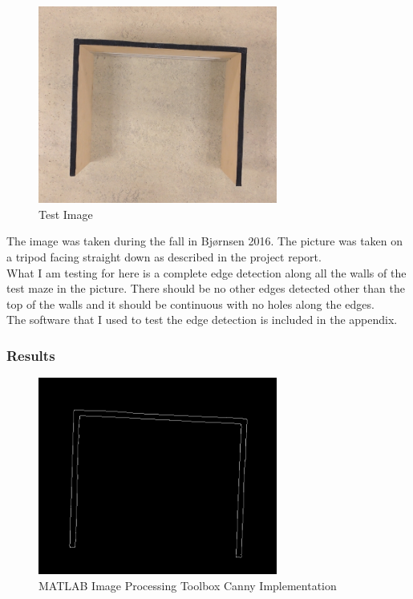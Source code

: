 \begin{figure}[H]
\centering
\includegraphics[width=0.7\textwidth]{fig/edgetest}
  \caption{Test Image}
  \label{fig:maze}
\end{figure}

The image was taken during the fall in Bjørnsen 2016\cite{kris}. The picture was taken on a tripod facing straight down as described in the project report.\\

What I am testing for here is a complete edge detection along all the walls of the test maze in the picture. There should be no other edges detected other than the top of the walls and it should be continuous with no holes along the edges.\\

The software that I used to test the edge detection is included in the appendix.

\subsubsection{Results}

\begin{figure}[H]
\centering
  \centering
  \includegraphics[width=0.7\textwidth]{fig/edge1}
  \caption{MATLAB Image Processing Toolbox Canny Implementation}
\end{figure}

